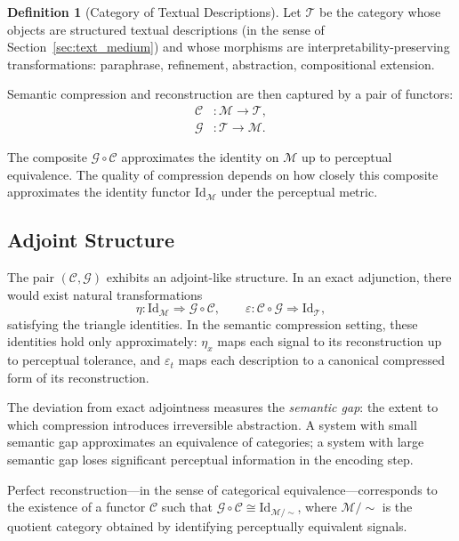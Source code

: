 \documentclass[12pt,a4paper]{article}
\theoremstyle{definition}
\newtheorem{definition}[theorem]{Definition}
\theoremstyle{remark}
\begin{document}
\begin{definition}[Category of Textual Descriptions]
Let $\mathcal{T}$ be the category whose objects are structured textual descriptions (in the sense of Section~\ref{sec:text_medium}) and whose morphisms are interpretability-preserving transformations: paraphrase, refinement, abstraction, compositional extension.
\end{definition}

Semantic compression and reconstruction are then captured by a pair of functors:
\begin{align}
\mathcal{C} &: \mathcal{M} \rightarrow \mathcal{T}, \\
\mathcal{G} &: \mathcal{T} \rightarrow \mathcal{M}.
\end{align}

The composite $\mathcal{G} \circ \mathcal{C}$ approximates the identity on $\mathcal{M}$ up to perceptual equivalence. The quality of compression depends on how closely this composite approximates the identity functor $\mathrm{Id}_\mathcal{M}$ under the perceptual metric.

\subsection{Adjoint Structure}

The pair $(\mathcal{C}, \mathcal{G})$ exhibits an adjoint-like structure. In an exact adjunction, there would exist natural transformations
\[
\eta : \mathrm{Id}_\mathcal{M} \Rightarrow \mathcal{G} \circ \mathcal{C}, \qquad \varepsilon : \mathcal{C} \circ \mathcal{G} \Rightarrow \mathrm{Id}_\mathcal{T},
\]
satisfying the triangle identities. In the semantic compression setting, these identities hold only approximately: $\eta_x$ maps each signal to its reconstruction up to perceptual tolerance, and $\varepsilon_t$ maps each description to a canonical compressed form of its reconstruction.

The deviation from exact adjointness measures the \emph{semantic gap}: the extent to which compression introduces irreversible abstraction. A system with small semantic gap approximates an equivalence of categories; a system with large semantic gap loses significant perceptual information in the encoding step.

Perfect reconstruction---in the sense of categorical equivalence---corresponds to the existence of a functor $\mathcal{C}$ such that $\mathcal{G} \circ \mathcal{C} \cong \mathrm{Id}_{\mathcal{M}/\!\sim}$, where $\mathcal{M}/\!\sim$ is the quotient category obtained by identifying perceptually equivalent signals.
\end{document}
